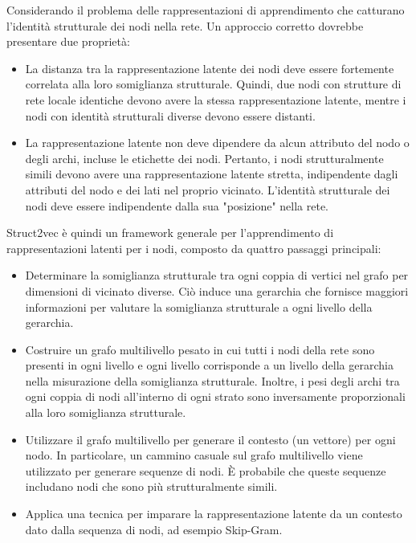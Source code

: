 \documentclass[11pt]{article}
\begin{document}
Considerando il problema delle rappresentazioni di apprendimento che catturano l'identità strutturale dei nodi nella rete. Un approccio corretto dovrebbe presentare due proprietà:
\begin{itemize}
  \item La distanza tra la rappresentazione latente dei nodi deve essere fortemente correlata alla loro somiglianza strutturale. Quindi, due nodi con strutture di rete locale identiche devono avere la stessa rappresentazione latente, mentre i nodi con identità strutturali diverse devono essere distanti.
  \item La rappresentazione latente non deve dipendere da alcun attributo del nodo o degli archi, incluse le etichette dei nodi.
Pertanto, i nodi strutturalmente simili devono avere una rappresentazione latente stretta, indipendente dagli attributi del nodo e dei lati nel proprio vicinato.
L'identità strutturale dei nodi deve essere indipendente dalla sua "posizione" nella rete.
\end{itemize}

Struct2vec è quindi un framework generale per l'apprendimento di rappresentazioni latenti per i nodi, composto da quattro passaggi principali:
\begin{itemize}
  \item Determinare la somiglianza strutturale tra ogni coppia di vertici nel grafo per dimensioni di vicinato diverse.
Ciò induce una gerarchia che fornisce maggiori informazioni per valutare la somiglianza strutturale a ogni livello della gerarchia.
  \item Costruire un grafo multilivello pesato in cui tutti i nodi della rete sono presenti in ogni livello e ogni livello corrisponde a un livello della gerarchia nella misurazione della somiglianza strutturale.
Inoltre, i pesi degli archi tra ogni coppia di nodi all'interno di ogni strato sono inversamente proporzionali alla loro somiglianza strutturale.
  \item Utilizzare il grafo multilivello per generare il contesto (un vettore) per ogni nodo.
In particolare, un cammino casuale sul grafo multilivello viene utilizzato per generare sequenze di nodi. 
È probabile che queste sequenze includano nodi che sono più strutturalmente simili.
  \item Applica una tecnica per imparare la rappresentazione latente da un contesto dato dalla sequenza di nodi, ad esempio Skip-Gram.
\end{itemize}
\end{document}
